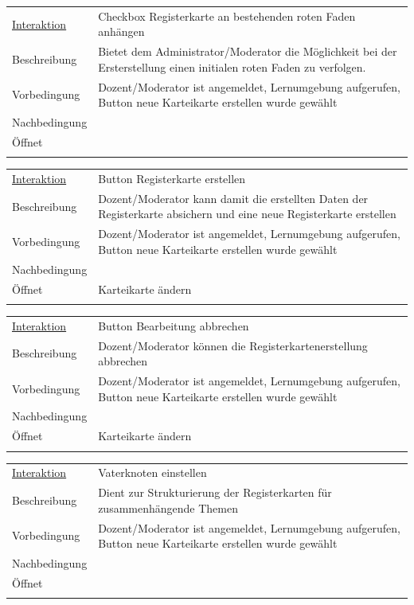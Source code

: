 \documentclass[12pt,a4paper]{article}
\begin{document}
{\begin{tabular}{l p{12cm}}
\underline{Interaktion} & Checkbox Registerkarte an bestehenden roten Faden anhängen    \\ 
Beschreibung   	 		& Bietet dem Administrator/Moderator die Möglichkeit bei der Ersterstellung einen initialen roten Faden zu verfolgen. \\
Vorbedingung	 		& Dozent/Moderator ist angemeldet, Lernumgebung aufgerufen, Button neue Karteikarte erstellen wurde gewählt\\
Nachbedingung	 		& \\
Öffnet			 		&  \\\\
\end{tabular}

\begin{tabular}{l p{12cm}}
\underline{Interaktion} & Button Registerkarte erstellen   \\ 
Beschreibung   	 		& Dozent/Moderator kann damit die erstellten Daten der Registerkarte absichern und eine neue Registerkarte erstellen\\
Vorbedingung	 		& Dozent/Moderator ist angemeldet, Lernumgebung aufgerufen, Button neue Karteikarte erstellen wurde gewählt\\
Nachbedingung	 		& \\
Öffnet			 		& \glqq Karteikarte ändern\grqq \\\\
\end{tabular}

\begin{tabular}{l p{12cm}}
\underline{Interaktion} & Button Bearbeitung abbrechen   \\ 
Beschreibung   	 		& Dozent/Moderator können die Registerkartenerstellung abbrechen\\
Vorbedingung	 		& Dozent/Moderator ist angemeldet, Lernumgebung aufgerufen, Button neue Karteikarte erstellen wurde gewählt\\
Nachbedingung	 		& \\
Öffnet			 		& \glqq Karteikarte ändern\grqq \\\\
\end{tabular}

\begin{tabular}{l p{12cm}}
\underline{Interaktion} & Vaterknoten einstellen   \\ 
Beschreibung   	 		& Dient zur Strukturierung der Registerkarten für zusammenhängende Themen\\
Vorbedingung	 		& Dozent/Moderator ist angemeldet, Lernumgebung aufgerufen, Button neue Karteikarte erstellen wurde gewählt\\
Nachbedingung	 		& \\
Öffnet			 		& \\\\
\end{tabular}





}
\end{document}
